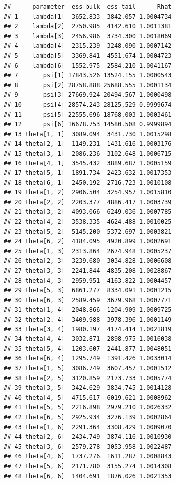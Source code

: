 \documentclass[
]{article}
\newenvironment{Shaded}{\begin{snugshade}}{\end{snugshade}}
\newcommand{\NormalTok}[1]{#1}
\newcommand{\SpecialCharTok}[1]{\textcolor[rgb]{0.81,0.36,0.00}{\textbf{#1}}}
\begin{document}
\linespread{1}

\begin{Shaded}
\end{Shaded}

\begin{verbatim}
##      parameter  ess_bulk  ess_tail      Rhat
## 1    lambda[1]  3652.833  3842.057 1.0004734
## 2    lambda[2]  2750.985  4142.610 1.0011381
## 3    lambda[3]  2456.986  3734.300 1.0018069
## 4    lambda[4]  2315.239  3248.090 1.0007142
## 5    lambda[5]  3369.841  4551.674 1.0004723
## 6    lambda[6]  1552.975  2584.210 1.0041167
## 7       psi[1] 17843.526 13524.155 1.0000543
## 8       psi[2] 28758.888 25688.555 1.0001134
## 9       psi[3] 27669.924 20494.567 1.0000498
## 10      psi[4] 28574.243 28125.529 0.9999674
## 11      psi[5] 22555.696 18768.003 1.0003461
## 12      psi[6] 16678.753 14580.508 0.9999894
## 13 theta[1, 1]  3089.094  3431.730 1.0015298
## 14 theta[2, 1]  1149.231  1431.616 1.0003176
## 15 theta[3, 1]  2086.236  3102.648 1.0006715
## 16 theta[4, 1]  3545.432  3889.687 1.0005159
## 17 theta[5, 1]  1891.734  2423.632 1.0017353
## 18 theta[6, 1]  2450.192  2716.723 1.0010108
## 19 theta[1, 2]  2906.504  3254.957 1.0015810
## 20 theta[2, 2]  2203.377  4886.417 1.0003739
## 21 theta[3, 2]  4093.066  6249.036 1.0007785
## 22 theta[4, 2]  3538.335  4624.488 1.0010025
## 23 theta[5, 2]  5145.200  5372.697 1.0003821
## 24 theta[6, 2]  4184.095  4920.899 1.0002691
## 25 theta[1, 3]  2313.864  2674.948 1.0005237
## 26 theta[2, 3]  3239.680  3034.828 1.0006608
## 27 theta[3, 3]  2241.844  4835.208 1.0028867
## 28 theta[4, 3]  2959.951  4163.822 1.0004457
## 29 theta[5, 3]  6861.277  8334.091 1.0001215
## 30 theta[6, 3]  2589.459  3679.968 1.0007771
## 31 theta[1, 4]  2048.866  1204.909 1.0009725
## 32 theta[2, 4]  3409.988  3978.396 1.0001149
## 33 theta[3, 4]  1980.197  4174.414 1.0021819
## 34 theta[4, 4]  3032.871  2898.975 1.0016038
## 35 theta[5, 4]  1203.607  2441.877 1.0048051
## 36 theta[6, 4]  1295.749  1391.426 1.0033014
## 37 theta[1, 5]  3086.749  3607.457 1.0001512
## 38 theta[2, 5]  3120.859  2173.733 1.0005774
## 39 theta[3, 5]  3424.629  3834.745 1.0014128
## 40 theta[4, 5]  4715.617  6019.621 1.0008962
## 41 theta[5, 5]  2216.898  2979.210 1.0026332
## 42 theta[6, 5]  2925.934  3276.139 1.0002864
## 43 theta[1, 6]  2291.364  3308.429 1.0009070
## 44 theta[2, 6]  2434.749  3874.116 1.0010930
## 45 theta[3, 6]  2579.278  3053.958 1.0022487
## 46 theta[4, 6]  1737.276  1611.287 1.0008843
## 47 theta[5, 6]  2171.780  3155.274 1.0014308
## 48 theta[6, 6]  1404.691  1876.026 1.0021353
\end{verbatim}
\end{document}
